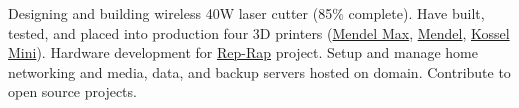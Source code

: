 \documentclass[10pt,letterpaper]{article}
\begin{document}
\spacedhrule{0.2em}{-0.4em}

{Designing and building wireless 40W laser cutter (85\% complete). Have built, tested, and placed into production four 3D printers (\href{http://reprap.org/wiki/MendelMax}{Mendel Max}, \href{http://reprap.org/wiki/Mendel}{Mendel}, \href{http://reprap.org/wiki/Kossel}{Kossel Mini}). Hardware development for \href{http://reprap.org/wiki/RepRap}{Rep-Rap} project. Setup and manage home networking and media, data, and backup servers hosted on domain. Contribute to open source projects.}

\end{document}
